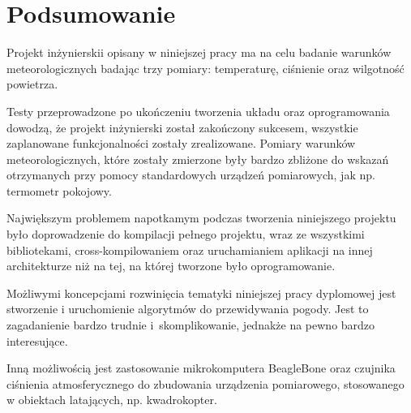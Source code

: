 \chapter{Podsumowanie}
Projekt inżynierskii opisany w niniejszej pracy ma na celu badanie warunków meteorologicznych badając trzy pomiary: temperaturę, ciśnienie oraz wilgotność powietrza.

Testy przeprowadzone po ukończeniu tworzenia układu oraz oprogramowania dowodzą, że projekt inżynierski został zakończony sukcesem, wszystkie zaplanowane funkcjonalności zostały zrealizowane. Pomiary warunków meteorologicznych, które zostały zmierzone były bardzo zbliżone do wskazań otrzymanych przy pomocy standardowych urządzeń pomiarowych, jak np. termometr pokojowy.

Największym problemem napotkamym podczas tworzenia niniejszego projektu było doprowadzenie do kompilacji pełnego projektu, wraz ze wszystkimi bibliotekami, cross-kompilowaniem oraz uruchamianiem aplikacji na innej architekturze niż na tej, na której tworzone było oprogramowanie.

Możliwymi koncepcjami rozwinięcia tematyki niniejszej pracy dyplomowej jest stworzenie i uruchomienie algorytmów do przewidywania pogody. Jest to zagadanienie bardzo trudnie i~skomplikowanie, jednakże na pewno bardzo interesujące.

Inną możliwością jest zastosowanie mikrokomputera BeagleBone oraz czujnika ciśnienia atmosferycznego do zbudowania urządzenia pomiarowego, stosowanego w obiektach latających, np. kwadrokopter.